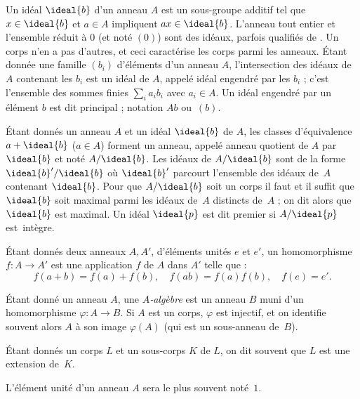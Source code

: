 \documentclass[11pt, useosf,
  title in boldface,
  theorem in new line,
  theorem numbering = section,
  number theorems separately,
]{simplivre}
\begin{document}
\enlargethispage*{\baselineskip}
    Un idéal \( \ideal{b} \) d'un anneau \( A \) est un sous-groupe additif tel que \( x \in \ideal{b} \) et \( a \in A \) impliquent \( ax \in \ideal{b} \). L'anneau tout entier et l'ensemble réduit à \( 0 \) (et noté \( (0) \)) sont des idéaux, parfois qualifiés de . Un corps n'en a pas d'autres, et ceci caractérise les corps parmi les anneaux. Étant donnée une famille \( (b_i) \) d'éléments d'un anneau \( A \), l'intersection des idéaux de \( A \) contenant les \( b_i \) est un idéal de \( A \), appelé idéal engendré par les \( b_i \) ; c'est l'ensemble des sommes finies \( \sum_i a_i b_i \) avec \( a_i \in A \). Un idéal engendré par un élément \( b \) est dit principal ; notation \( Ab \) ou~\( (b) \).

    Étant donnés un anneau \( A \) et un idéal \( \ideal{b} \) de \( A \), les classes d'équivalence \( a+\ideal{b} \) (\( a \in A \)) forment un anneau, appelé anneau quotient de \( A \) par \( \ideal{b} \) et noté \( A/\ideal{b} \). Les idéaux de \( A/\ideal{b} \) sont de la forme \( \ideal{b}'/\ideal{b} \) où \( \ideal{b}' \) parcourt l'ensemble des idéaux de~\( A \) contenant \( \ideal{b} \). Pour que \( A/\ideal{b} \) soit un corps il faut et il suffit que \( \ideal{b} \) soit maximal parmi les idéaux de~\( A \) distincts de~\( A \) ; on dit alors que \( \ideal{b} \) est maximal. Un idéal \( \ideal{p} \) est dit premier si \( A/\ideal{p} \) est~intègre.

    Étant donnés deux anneaux \( A, A' \), d'éléments unités \( e \) et \( e' \), un homomorphisme \( f \colon A \to A' \) est une application \( f \) de \( A \) dans \( A' \) telle que :
    \[
        f(a+b) = f(a)+f(b), \quad f(ab) = f(a)f(b), \quad f(e) = e'.
    \]

    Étant donné un anneau \( A \), une \emph{\( A \)‑algèbre} est un anneau \( B \) muni d'un homomorphisme \( \varphi \colon A \to B \). Si \( A \) est un corps, \( \varphi \) est injectif, et on identifie souvent alors \( A \) à son image \( \varphi(A) \) (qui est un sous-anneau de~\( B \)).

    Étant donnés un corps \( L \) et un sous-corps \( K \) de \( L \), on dit souvent que \( L \) est une extension de~\( K \).

    L'élément unité d'un anneau \( A \) sera le plus souvent noté~\( 1 \).
\end{document}
